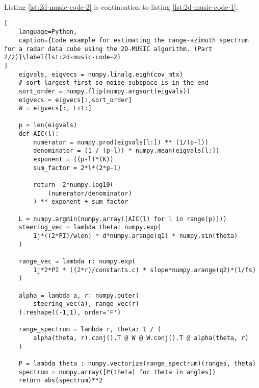 Listing \ref{lst:2d-music-code-2} is continuation to listing \ref{lst:2d-music-code-1}.
\begin{lstlisting}[
    language=Python,
    caption={Code example for estimating the range-azimuth spectrum for a radar data cube using the 2D-MUSIC algorithm. (Part 2/2)}\label{lst:2d-music-code-2}
]
    eigvals, eigvecs = numpy.linalg.eigh(cov_mtx)
    # sort largest first so noise subspace is in the end
    sort_order = numpy.flip(numpy.argsort(eigvals))
    eigvecs = eigvecs[:,sort_order]
    W = eigvecs[:, L+1:]

    p = len(eigvals)
    def AIC(l):
        numerator = numpy.prod(eigvals[l:]) ** (1/(p-l))
        denominator = (1 / (p-l)) * numpy.mean(eigvals[l:])
        exponent = ((p-l)*(K))
        sum_factor = 2*l*(2*p-l)

        return -2*numpy.log10(
            (numerator/denominator)
        ) ** exponent + sum_factor

    L = numpy.argmin(numpy.array([AIC(l) for l in range(p)]))
    steering_vec = lambda theta: numpy.exp(
        1j*((2*PI)/wlen) * d*numpy.arange(q1) * numpy.sin(theta)
    )
    
    range_vec = lambda r: numpy.exp(
        1j*2*PI * ((2*r)/constants.c) * slope*numpy.arange(q2)*(1/fs)
    )
    
    alpha = lambda a, r: numpy.outer(
        steering_vec(a), range_vec(r)
    ).reshape((-1,1), order='F')
    
    range_spectrum = lambda r, theta: 1 / (
        alpha(theta, r).conj().T @ W @ W.conj().T @ alpha(theta, r)
    )
    
    P = lambda theta : numpy.vectorize(range_spectrum)(ranges, theta)
    spectrum = numpy.array([P(theta) for theta in angles])
    return abs(spectrum)**2
\end{lstlisting}